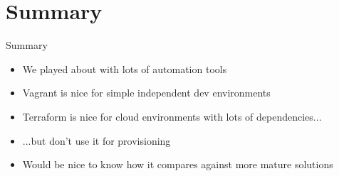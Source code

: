 \documentclass[xcolor=dvipsnames]{beamer}
\begin{document}
\section{Summary}
\begin{frame}{Summary}
  \begin{itemize}
    \item We played about with lots of automation tools
    \item Vagrant is nice for simple independent dev environments
    \item Terraform is nice for cloud environments with lots of dependencies...
    \item ...but don't use it for provisioning
    \item Would be nice to know how it compares against more mature solutions
  \end{itemize}
\end{frame}
\end{document}
